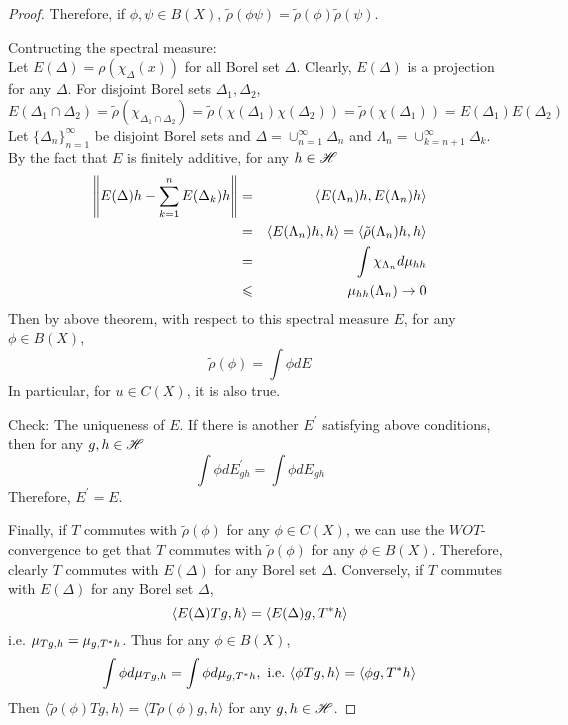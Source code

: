 \documentclass[a4paper,11pt]{report}
\begin{document}
\begin{proof}
	Therefore, if $\phi,\psi \in B(X)$, $\tilde{\rho}(\phi\psi) = \tilde{\rho}(\phi)\tilde{\rho}(\psi)$.
	\item Contructing the spectral measure: \\
	Let $E(\Delta) = \rho(\chi_{\Delta}(x))$ for all Borel set $\Delta$. Clearly, $E(\Delta)$ is a projection for any $\Delta$. For disjoint Borel sets $\Delta_1, \Delta_2$,
	\begin{equation*}
		E(\Delta_1 \cap \Delta_2) = \tilde{\rho}(\chi_{\Delta_1 \cap \Delta_2}) = \tilde{\rho}(\chi(\Delta_1)\chi(\Delta_2)) =\tilde{\rho}(\chi(\Delta_1)) = E(\Delta_1)E(\Delta_2)
	\end{equation*}
	Let $\{\Delta_n\}_{n=1}^{\infty}$ be disjoint Borel sets and $\Delta = \cup_{n=1}^{\infty}\Delta_n$ and $\Lambda_n = \cup_{k=n+1}^{\infty}\Delta_k$. By the fact that $E$ is finitely additive, for any $h \in \mathscr{H}$
	\begin{eqnarray*}
	\left\lVert E(\Delta)h-\sum_{k=1}^{n}E(\Delta_k)h\right\lVert &=& \langle E(\Lambda_n)h, E(\Lambda_n)h \rangle \\
	&=& \langle E(\Lambda_n)h, h \rangle = \langle \tilde{\rho}(\Lambda_n)h, h \rangle \\
	&=& \int \chi_{\Lambda_n} d\mu_{hh} \\
	&\leqslant& \mu_{hh}(\Lambda_n) \rightarrow 0
	\end{eqnarray*}
	Then by above theorem, with respect to this spectral measure $E$, for any $\phi \in B(X)$,
	\begin{equation*}
		\tilde{\rho}(\phi) = \int \phi dE
	\end{equation*}
	In particular, for $u \in C(X)$, it is also true.
	\item Check: The uniqueness of $E$.
	If there is another $E^{'}$ satisfying above conditions, then for any $g,h \in \mathscr{H}$
	\begin{equation*}
		\int \phi dE^{'}_{gh} = \int \phi dE_{gh}
	\end{equation*}
	Therefore, $E^{'} = E$.
	\item Finally, if $T$ commutes with $\tilde{\rho}(\phi)$ for any $\phi \in C(X)$, we can use the $WOT$-convergence to get that $T$ commutes with $\tilde{\rho}(\phi)$ for any $\phi \in B(X)$. Therefore, clearly $T$ commutes with $E(\Delta)$ for any Borel set $\Delta$. Conversely, if $T$ commutes with $E(\Delta)$ for any Borel set $\Delta$, 
	\begin{equation*}
		\langle E(\Delta)Tg,h \rangle = \langle E(\Delta)g,T^{*}h \rangle
	\end{equation*}
	i.e. $\mu_{Tg,h} = \mu_{g, T^{*}h}$. Thus for any $\phi \in B(X)$,
	\begin{equation*}
		\int \phi d\mu_{Tg,h} = \int \phi d\mu_{g,T^{*}h},~\text{i.e.}~\langle \phi Tg,h \rangle = \langle \phi g,T^{*}h \rangle
	\end{equation*}
	Then $\langle \tilde{\rho}(\phi) Tg,h \rangle = \langle T \tilde{\rho}(\phi) g,h \rangle$ for any $g,h \in \mathscr{H}$.
\end{proof}
\end{document}
